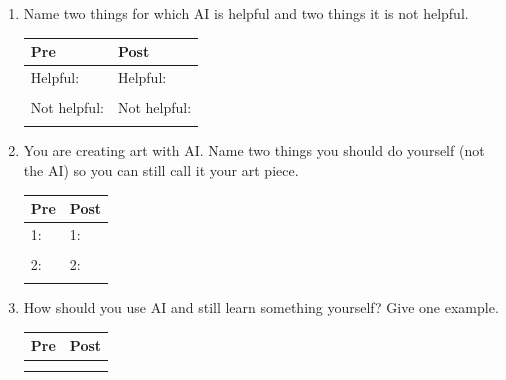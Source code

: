 \documentclass[11pt]{article}
\begin{document}
\begin{enumerate}
\item Name two things for which AI is helpful and two things it is not helpful. \\[0.3em]

\begin{tabular}{|m{20em}|m{20em}|}
   \hline Pre  &  Post \\ \hline
   Helpful: & Helpful: \\
   \rule{0pt}{1.5cm} & \rule{0pt}{1.5cm} \\
   Not helpful: & Not helpful: \\
   \rule{0pt}{1.5cm} & \rule{0pt}{1.5cm} \\
   \hline
\end{tabular}

\newpage
\item You are creating art with AI. Name two things you should do yourself (not the AI) so you can still call it your art piece.\\[0.3em]
\begin{tabular}{|m{20em}|m{20em}|}
   \hline Pre  &  Post \\ \hline
   1: & 1: \\
   \rule{0pt}{1.5cm} & \rule{0pt}{1.5cm} \\
   2: & 2: \\
   \rule{0pt}{1.5cm} & \rule{0pt}{1.5cm} \\
   \hline
\end{tabular}
\item How should you use AI and still learn something yourself? Give one example.\\[0.3em]

\begin{tabular}{|m{20em}|m{20em}|}
   \hline Pre  &  Post \\ \hline
    \rule{0pt}{3cm} & \rule{0pt}{3cm}  \\
   \vspace*{5cm } & \vspace{5cm } \\

   \hline
\end{tabular}

\end{enumerate}
\end{document}
